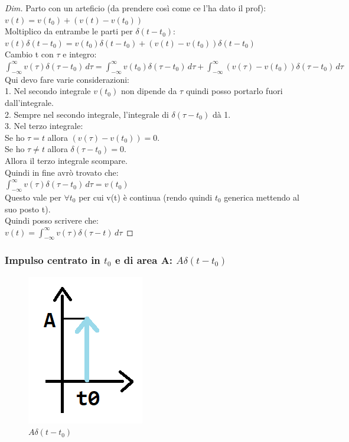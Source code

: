 	\begin{proof}[Dim]
		Parto con un arteficio (da prendere così come ce l'ha dato il prof): $ v(t)=v(t_0)+( v(t) - v(t_0) )$\\
		Moltiplico da entrambe le parti per $ \delta (t-t_0)$:\\
		$ v(t) \delta (t-t_0) =v(t_0) \delta (t-t_0) +( v(t) - v(t_0) ) \delta (t-t_0) $\\
		Cambio t con $ \tau $ e integro:\\
		$ \int_{ - \infty}^{ \infty} v(\tau) \delta (\tau-t_0) \, d\tau 
		= \int_{ - \infty}^{ \infty} v(t_0) \delta (\tau-t_0) \, d\tau 
		+ \int_{ - \infty}^{ \infty} ( v(\tau) - v(t_0) ) \delta (\tau-t_0)\, d\tau $\\
		Qui devo fare varie considerazioni:\\
		1. Nel secondo integrale $ v(t_0) $ non dipende da $ \tau $ quindi posso portarlo fuori dall'integrale. \\
		2. Sempre nel secondo integrale, l'integrale di $ \delta (\tau-t_0) $ dà 1.\\
		3. Nel terzo integrale:\\
		Se ho $ \tau = t $ allora $ ( v(\tau) - v(t_0) ) = 0 $. \\
		Se ho $ \tau \neq t $ allora $ \delta (\tau-t_0) = 0 $. \\
		Allora il terzo integrale scompare.\\
		Quindi in fine avrò trovato che:\\
		$ \int_{ - \infty}^{ \infty} v(\tau) \delta (\tau-t_0) \, d\tau = v(t_0) $\\
		Questo vale per $ \forall t_0 $ per cui v(t) è continua (rendo quindi $t_0$ generica mettendo al suo posto t).\\ Quindi posso scrivere che:\\
		$ v(t) = \int_{ - \infty}^{ \infty} v(\tau) \delta (\tau-t) \, d\tau$
	\end{proof}

\subsubsection{Impulso centrato in $t_0$ e di area A: $ A \delta (t-t_0)$}

	\begin{figure}[h]
		\centering
		\includegraphics[scale=0.5]{immagini/deltaGenerica}
		\caption{ $ A \delta (t-t_0)$ }
		\label{fig: deltaGenerica}
	\end{figure}

